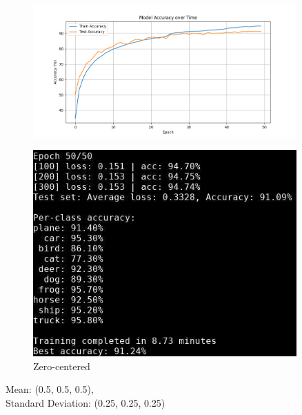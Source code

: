 \documentclass{beamer}
\begin{document}
\begin{frame}
\begin{columns}
    \begin{column}{0.4\textwidth}
        \begin{figure}[t]
            \centering
            \vspace{-0.4cm}
            \includegraphics[width=0.9\textwidth]{media/cifar10_cnn_zero_accuracy.png}
        \end{figure}
        \vspace{-0.6cm}
        \begin{figure}[t]
            \centering
            \includegraphics[width=0.9\textwidth]{media/cnn_zero_epoch_50.png}
            \vspace{-0.3cm}
            \caption{Zero-centered}
        \end{figure}
        Mean: (0.5, 0.5, 0.5),\\
        Standard Deviation: (0.25, 0.25, 0.25)
    \end{column}
\end{columns}
\end{frame}
\end{document}
